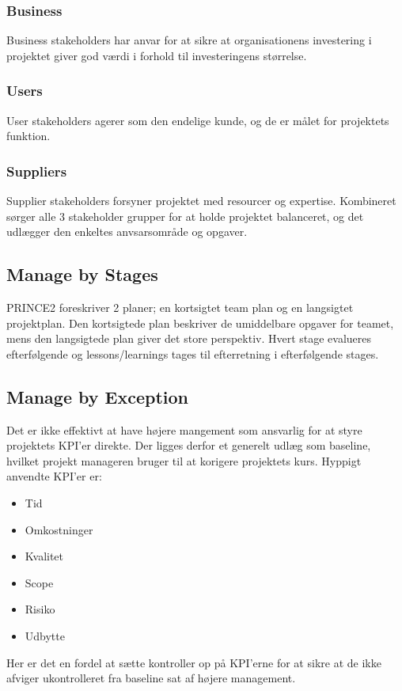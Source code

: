 \documentclass[12pt,twoside]{article}
\begin{document}
    \subsubsection*{Business}
    Business stakeholders har anvar for at sikre at organisationens investering i projektet giver god værdi i forhold til investeringens størrelse.

    \subsubsection*{Users}
    User stakeholders agerer som den endelige kunde, og de er målet for projektets funktion.

    \subsubsection*{Suppliers}
    Supplier stakeholders forsyner projektet med resourcer og expertise. Kombineret sørger alle 3 stakeholder grupper for at holde projektet balanceret, og det udlægger den enkeltes anvsarsområde og opgaver.

    \subsection{Manage by Stages}
    PRINCE2 foreskriver 2 planer; en kortsigtet team plan og en langsigtet projektplan. Den kortsigtede plan beskriver de umiddelbare opgaver for teamet, mens den langsigtede plan giver det store perspektiv. Hvert stage evalueres efterfølgende og lessons/learnings tages til efterretning i efterfølgende stages.

    \subsection{Manage by Exception}
    Det er ikke effektivt at have højere mangement som ansvarlig for at styre projektets KPI'er direkte. Der ligges derfor et generelt udlæg som baseline, hvilket projekt manageren bruger til at korigere projektets kurs. Hyppigt anvendte KPI'er er:
    \begin{itemize}
        \item Tid
        \item Omkostninger
        \item Kvalitet
        \item Scope
        \item Risiko
        \item Udbytte
    \end{itemize}
    Her er det en fordel at sætte kontroller op på KPI'erne for at sikre at de ikke afviger ukontrolleret fra baseline sat af højere management.
\end{document}
